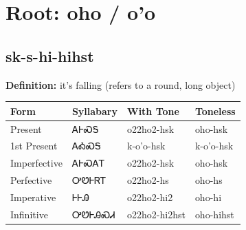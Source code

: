 \documentclass{article}%
\begin{document}
%
\normalsize%
\section*{Root: oho / o'o}%
\subsection*{sk-s-hi-hihst}%
\textbf{Definition: }%
it’s falling (refers to a round‚ long object)%
\\[0.5em]%
\begin{tabular}{|l|l|l|l|}%
\hline%
\textbf{Form}&\textbf{Syllabary}&\textbf{With Tone}&\textbf{Toneless}\\%
\hline%
Present&ᎪᎰᏍᎦ&o22ho2{-}hsk&oho{-}hsk\\%
1st Present&ᎪᎣᏍᎦ&k{-}o'o{-}hsk&k{-}o'o{-}hsk\\%
Imperfective&ᎪᎰᏍᎪᎢ&o22ho2{-}hsk&oho{-}hsk\\%
Perfective&ᎤᏬᎰᏒᎢ&o22ho2{-}hs&oho{-}hs\\%
Imperative&ᎰᎰᎯ&o22ho2{-}hi2&oho{-}hi\\%
Infinitive&ᎤᏬᎰᎯᏍᏗ&o22ho2{-}hi2hst&oho{-}hihst\\%
\hline%
\end{tabular}%
\\[1em]%
\end{document}
